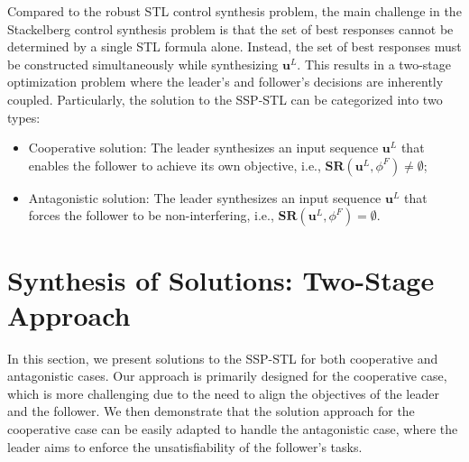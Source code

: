 \documentclass[letterpaper, 10 pt, conference]{ieeeconf}
\newtheorem{remark}{Remark}[section]
\begin{document}
Compared to the robust STL control synthesis problem, the main challenge in the Stackelberg control synthesis problem is that the set of best responses cannot be determined by a single STL formula alone. Instead, the set of best responses must be constructed simultaneously while synthesizing $\mathbf{u}^L$. This results in a two-stage optimization problem where the leader's and follower's decisions are inherently coupled.
Particularly, the solution to the SSP-STL can be categorized into two types:  
\begin{itemize}  
\item 
Cooperative solution: 
The leader synthesizes an input sequence $\mathbf{u}^L$ that enables the follower to achieve its own objective, i.e., $\mathbf{SR}(\mathbf{u}^L, \phi^F)\neq \emptyset$;  
\item 
Antagonistic solution: The leader synthesizes an input sequence $\mathbf{u}^L$ that forces the follower to be non-interfering, i.e., $\mathbf{SR}(\mathbf{u}^L, \phi^F)=\emptyset$.  
\end{itemize}


\section{Synthesis of Solutions: Two-Stage Approach}\label{sec-two}

In this section, we present solutions to the SSP-STL for both cooperative and antagonistic cases. Our approach is primarily designed for the cooperative case, which is more challenging due to the need to align the objectives of the leader and the follower. We then demonstrate that the solution approach for the cooperative case can be easily adapted to handle the antagonistic case, where the leader aims to enforce the unsatisfiability of the follower's tasks. 
\end{document}
